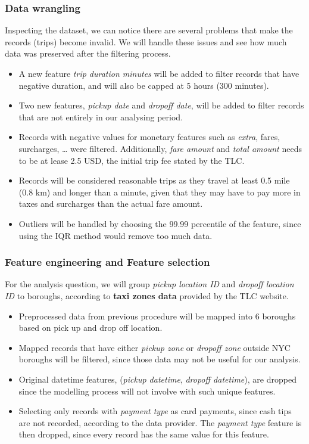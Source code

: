 \documentclass[11pt]{article}
\begin{document}
\subsubsection{Data wrangling}

Inspecting the dataset, we can notice there are several problems that make the records (trips) become invalid. We will handle these issues and see how much data was preserved after the filtering process\cite{sample_solution}.

\begin{itemize}
    \item A new feature \textit{trip duration minutes} will be added to filter records that have negative duration, and will also be capped at 5 hours (300 minutes).
    \item Two new features, \textit{pickup date} and \textit{dropoff date}, will be added to filter records that are not entirely in our analysing period.
    \item Records with negative values for monetary features such as \textit{extra}, fares, surcharges, … were filtered. Additionally, \textit{fare amount} and \textit{total amount} needs to be at lease 2.5 USD, the initial trip fee stated by the TLC.
    \item Records will be considered reasonable trips as they travel at least 0.5 mile (0.8 km) and longer than a minute, given that they may have to pay more in taxes and surcharges than the actual fare amount.
    \item Outliers will be handled by choosing the 99.99 percentile of the feature, since using the IQR method would remove too much data.
\end{itemize}

\subsubsection{Feature engineering and Feature selection}

For the analysis question, we will group \textit{pickup location ID} and \textit{dropoff location ID} to boroughs, according to \textbf{taxi zones data} provided by the TLC website.

\begin{itemize}
    \item Preprocessed data from previous procedure will be mapped into 6 boroughs based on pick up and drop off location. 
    \item Mapped records that have either \textit{pickup zone} or \textit{dropoff zone} outside NYC boroughs will be filtered, since those data may not be useful for our analysis.
    \item Original datetime features, (\textit{pickup datetime}, \textit{dropoff datetime}), are dropped since the modelling process will not involve with such unique features.
    \item Selecting only records with \textit{payment type} as card payments, since cash tips are not recorded, according to the data provider. The \textit{payment type} feature is then dropped, since every record has the same value for this feature.
\end{itemize}
\end{document}
